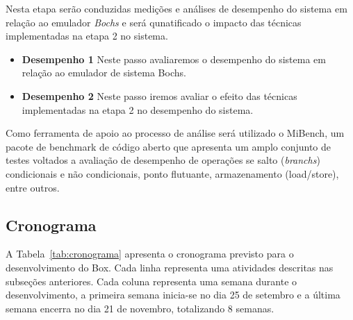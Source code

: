 \documentclass[11pt,twoside]{article}
\begin{document}
Nesta etapa serão conduzidas medições e análises de desempenho do sistema em relação ao emulador \emph{Bochs} e será qunatificado o impacto das técnicas implementadas na etapa 2 no sistema.

\begin{itemize}
 \item \textbf{Desempenho 1} Neste passo avaliaremos o desempenho do sistema em relação ao emulador de sistema Bochs.
 \item \textbf{Desempenho 2} Neste passo iremos avaliar o efeito das técnicas implementadas na etapa 2 no desempenho do sistema.
\end{itemize}

Como ferramenta de apoio ao processo de análise será utilizado o MiBench\cite{Guthaus2001}, um pacote de benchmark de código aberto que apresenta um amplo conjunto de testes voltados a avaliação de desempenho de operações se salto (\emph{branchs}) condicionais e não condicionais, ponto flutuante, armazenamento (load/store), entre outros.
 
\subsection{Cronograma}

A Tabela~\ref{tab:cronograma} apresenta o cronograma previsto para o desenvolvimento do Box.
Cada linha representa uma atividades descritas nas subseções anteriores. Cada coluna representa
uma semana durante o desenvolvimento, a primeira semana inicia-se no dia 25 de setembro e a
última semana encerra no dia 21 de novembro, totalizando 8 semanas.
\end{document}
